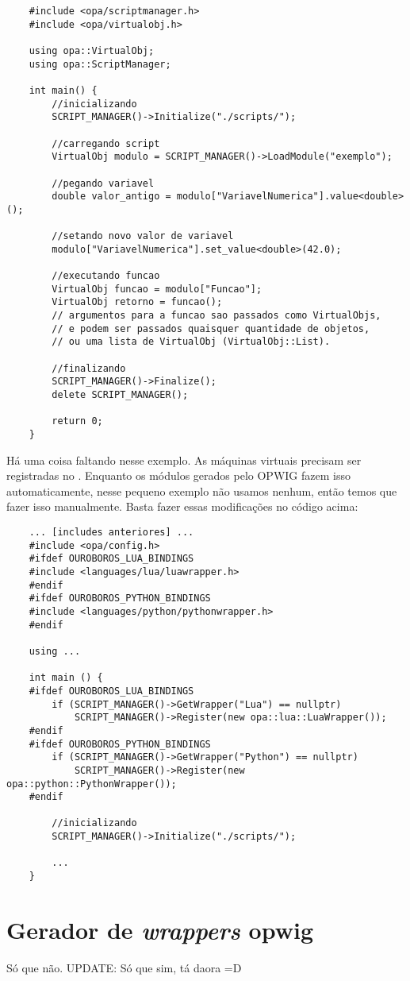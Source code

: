 \begin{enumerate}
    \begin{lstlisting}
    #include <opa/scriptmanager.h>
    #include <opa/virtualobj.h>
    
    using opa::VirtualObj;
    using opa::ScriptManager;
    
    int main() {
        //inicializando
        SCRIPT_MANAGER()->Initialize("./scripts/");
        
        //carregando script
        VirtualObj modulo = SCRIPT_MANAGER()->LoadModule("exemplo");
        
        //pegando variavel
        double valor_antigo = modulo["VariavelNumerica"].value<double>();
        
        //setando novo valor de variavel
        modulo["VariavelNumerica"].set_value<double>(42.0);
        
        //executando funcao
        VirtualObj funcao = modulo["Funcao"];
        VirtualObj retorno = funcao(); 
        // argumentos para a funcao sao passados como VirtualObjs, 
        // e podem ser passados quaisquer quantidade de objetos,
        // ou uma lista de VirtualObj (VirtualObj::List).
        
        //finalizando
        SCRIPT_MANAGER()->Finalize();
        delete SCRIPT_MANAGER();
        
        return 0;
    }
    \end{lstlisting}
    
    Há uma coisa faltando nesse exemplo. As máquinas virtuais precisam ser registradas no \SMgr{}.
    Enquanto os módulos gerados pelo OPWIG fazem isso automaticamente, nesse pequeno exemplo não
    usamos nenhum, então temos que fazer isso manualmente. Basta fazer essas modificações no código acima:
    
    \begin{lstlisting}
    ... [includes anteriores] ...
    #include <opa/config.h>
    #ifdef OUROBOROS_LUA_BINDINGS
    #include <languages/lua/luawrapper.h>
    #endif
    #ifdef OUROBOROS_PYTHON_BINDINGS
    #include <languages/python/pythonwrapper.h>
    #endif
    
    using ...
    
    int main () {
    #ifdef OUROBOROS_LUA_BINDINGS
        if (SCRIPT_MANAGER()->GetWrapper("Lua") == nullptr)
            SCRIPT_MANAGER()->Register(new opa::lua::LuaWrapper());    
    #endif
    #ifdef OUROBOROS_PYTHON_BINDINGS
        if (SCRIPT_MANAGER()->GetWrapper("Python") == nullptr)
            SCRIPT_MANAGER()->Register(new opa::python::PythonWrapper());
    #endif
    
        //inicializando
        SCRIPT_MANAGER()->Initialize("./scripts/");
        
        ...
    }
    \end{lstlisting}
  
\end{enumerate}


\section{Gerador de \emph{wrappers} \textbf{opwig}}

Só que não. 
UPDATE: Só que sim, tá daora =D
